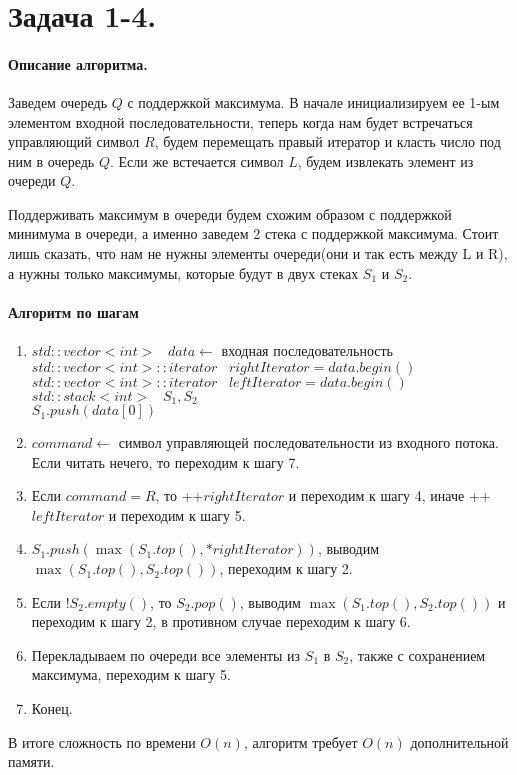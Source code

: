 \documentclass[12pt]{article}
\begin{document}
~

~

~

~

~

~

~

~




\section{Задача 1-4.} 
\paragraph{Описание алгоритма.}
Заведем очередь $ Q $ с поддержкой максимума. В начале инициализируем ее 1-ым элементом входной последовательности, 
теперь когда нам будет встречаться управляющий символ $ R $, будем перемещать правый
итератор и класть число под ним в очередь $ Q $. Если же встечается символ $ L $, будем извлекать 
элемент из очереди $ Q $.

Поддерживать максимум в очереди будем схожим образом с поддержкой минимума в очереди, а именно заведем 2 стека с 
поддержкой максимума. Стоит лишь сказать, что нам не нужны элементы очереди(они и так есть между L и R), 
а нужны только максимумы, которые будут в двух стеках $ S_1 $ и $ S_2 $. 


\paragraph{Алгоритм по шагам}
\begin{enumerate}
    \item $ std::vector<int> \;\;\; data \leftarrow $ входная последовательность \\
          $ std::vector<int>::iterator \;\;\; rightIterator = data.begin() $ \\
          $ std::vector<int>::iterator \;\;\; leftIterator = data.begin() $ \\
          $ std::stack<int> \;\;\; S_1, S_2 $ \\
          $ S_1.push(data[0]) $
    \item $ command \leftarrow $ символ управляющей последовательности из входного потока.
          Если читать нечего, то переходим к шагу 7.
    \item Если $ command = R $, то   ++$rightIterator $ и переходим к шагу 4, иначе ++$leftIterator$ и переходим к шагу 5.
    \item $ S_1.push(\max(S_1.top(), *rightIterator)) $, выводим $ \max(S_1.top(), S_2.top()) $, переходим к шагу 2.
    \item Если $ ! S_2.empty() $, то $ S_2.pop() $, выводим $ \max(S_1.top(), S_2.top()) $ и переходим к шагу 2,
          в противном случае переходим к шагу 6.
    \item Перекладываем по очереди все элементы из $ S_1 $ в $ S_2 $, также с сохранением максимума, переходим к шагу 5.
    \item Конец.
\end{enumerate}

В итоге сложность по времени $ O(n) $, алгоритм требует $ O(n) $ дополнительной памяти.
\end{document}
